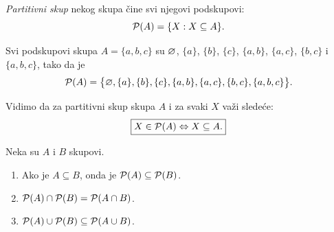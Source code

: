 \begin{DEF}
  \emph{Partitivni skup} nekog skupa \v cine svi njegovi podskupovi:
  $$
    \mathcal{P}(A) = \{ X : X \subseteq A \}.
  $$
\end{DEF}

\begin{EX}
  Svi podskupovi skupa $A = \{a, b, c\}$ su $\varnothing$, $\{a\}$, $\{b\}$, $\{c\}$, $\{a, b\}$, $\{a, c\}$, $\{b, c\}$ i $\{a, b, c\}$,
  tako da je
  $$
    \mathcal{P}(A) = \big\{
      \varnothing, \{a\}, \{b\}, \{c\}, \{a, b\}, \{a, c\}, \{b, c\}, \{a, b, c\}
    \big\}.
  $$
\end{EX}

\noindent
Vidimo da za partitivni skup skupa $A$ i za svaki $X$ va\v zi slede\'ce:
$$
  \fbox{$X \in \mathcal{P}(A) \Leftrightarrow X \subseteq A$.}
$$

\begin{THM}
  Neka su $A$ i $B$ skupovi.
  \begin{enumerate}
  \item
    Ako je $A \subseteq B$, onda je $\mathcal{P}(A) \subseteq \mathcal{P}(B)$.
  \item
    $\mathcal{P}(A) \cap \mathcal{P}(B) = \mathcal{P}(A \cap B)$.
  \item
    $\mathcal{P}(A) \cup \mathcal{P}(B) \subseteq \mathcal{P}(A \cup B)$.
  \end{enumerate}
\end{THM}

